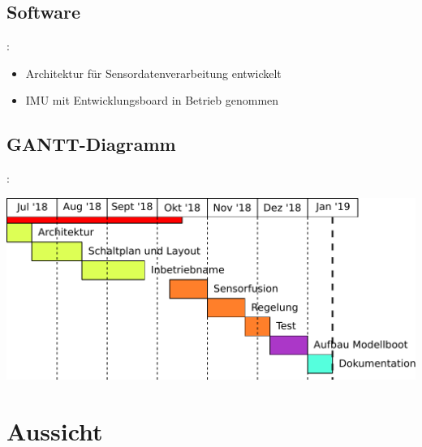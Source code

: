 \documentclass{beamer}
\begin{document}
\subsection{Software}
\begin{frame}{\insertsection: \insertsubsection}
	\begin{itemize}
		\item Architektur für Sensordatenverarbeitung entwickelt
		\item IMU mit Entwicklungsboard in Betrieb genommen
	\end{itemize}
\end{frame}

\subsection{GANTT-Diagramm}
\begin{frame}{\insertsection: \insertsubsection}

\includegraphics[width=\linewidth]{gantt}

\end{frame}

\section{Aussicht}
\end{document}
